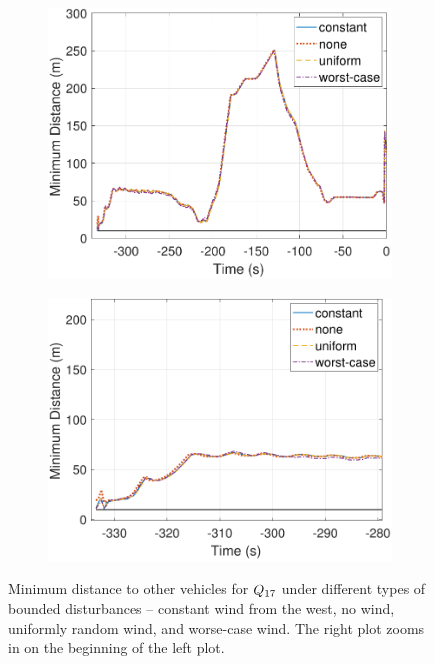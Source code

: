 \begin{figure}[!htb]
  \centering
  \begin{subfigure}{0.5\textwidth}
    \includegraphics[width=\columnwidth]{figs/min_dists}
    \subcaption{}
    \label{fig:min_dists_s1}
  \end{subfigure}%
  \begin{subfigure}{0.5\textwidth}
    \includegraphics[width=\columnwidth]{figs/min_dists_zoomed_in}
    \subcaption{}
    \label{fig:min_dists_s2}
  \end{subfigure}%
  
  \caption{Minimum distance to other vehicles for $Q_{17}$ under different types of bounded disturbances -- constant wind from the west, no wind, uniformly random wind, and worse-case wind. The right plot zooms in on the beginning of the left plot.}
  \label{fig:min_dists}
\end{figure}

